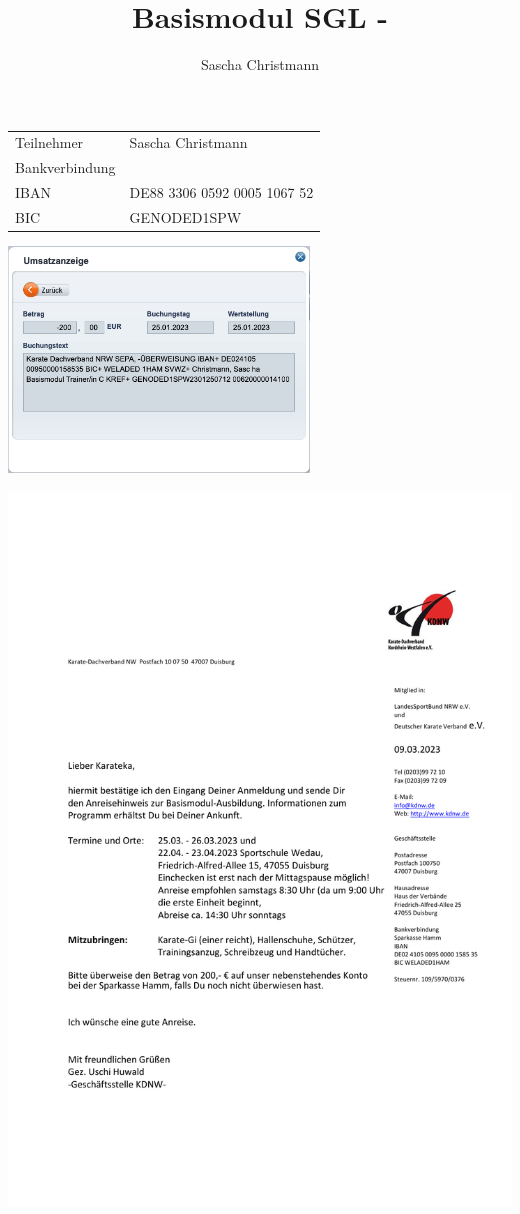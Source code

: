 \documentclass[10pt,a4paper,twoside=false,DIV=calc]{scrartcl}
\title{Basismodul SGL - \LaTeXe}
\author{Sascha Christmann}
\begin{document}
\begin{tabular}{ll}
	Teilnehmer&  Sascha Christmann \\
	Bankverbindung &  \\
	IBAN & DE88 3306 0592 0005 1067 52\\
	BIC & GENODED1SPW \\
\end{tabular}
\begin{center}
	\includegraphics[width=8cm]{"gfx/Bildschirmfoto 2023-08-09 um 10.03.34"}
\end{center}
\begin{center}
	\includegraphics[width=0.7\linewidth]{"gfx/Einladung Basismodul 2023"}
\end{center}





\end{document}
